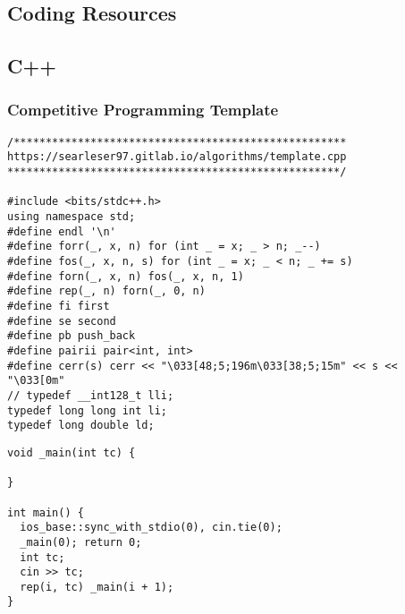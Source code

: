 \documentclass[twoside]{article}
\begin{document}

\null
\thispagestyle{empty}
\newpage
{}
\selectfont
\begin{multicols*}{2}
	\tableofcontents
	\newpage
	\cleardoublepage
{}
\sectionfont{\bfseries\sffamily\centering\Huge}
\vspace{1em}
\section*{Coding Resources}
\vspace{3em}
\subsectionfont{\bfseries\sffamily\centering\LARGE}
\vspace{0em}
\subsection*{C++}
\vspace{2em}
\subsubsectionfont{\large\bfseries\sffamily\underline}
\subsubsection*{Competitive Programming Template}
\begin{verbatim}
/****************************************************
https://searleser97.gitlab.io/algorithms/template.cpp
****************************************************/

#include <bits/stdc++.h>
using namespace std;
#define endl '\n'
#define forr(_, x, n) for (int _ = x; _ > n; _--)
#define fos(_, x, n, s) for (int _ = x; _ < n; _ += s)
#define forn(_, x, n) fos(_, x, n, 1)
#define rep(_, n) forn(_, 0, n)
#define fi first
#define se second
#define pb push_back
#define pairii pair<int, int>
#define cerr(s) cerr << "\033[48;5;196m\033[38;5;15m" << s << "\033[0m"
// typedef __int128_t lli;
typedef long long int li;
typedef long double ld;
\end{verbatim}
\vspace{-12pt}
\begin{verbatim}
void _main(int tc) {
  
}

int main() {
  ios_base::sync_with_stdio(0), cin.tie(0);
  _main(0); return 0;
  int tc;
  cin >> tc;
  rep(i, tc) _main(i + 1);
}
\end{verbatim}


\end{multicols*}
\end{document}

